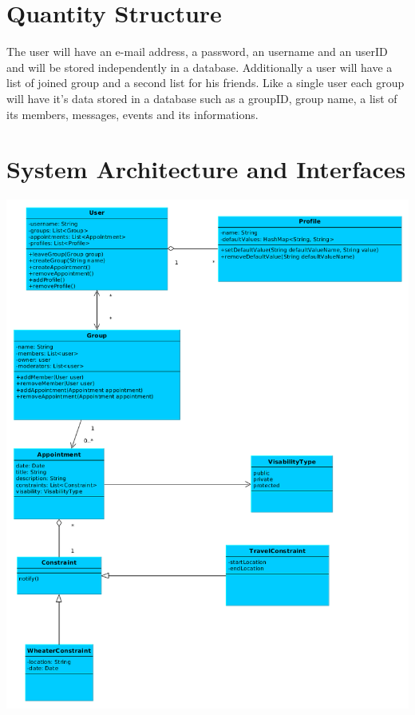 \documentclass[12pt]{scrartcl}
\begin{document}

    \section{Quantity Structure}                                %
        The user will have an e-mail address, a password, an username and an userID and will be stored independently
        in a database. Additionally a user will have a list of joined group and a second list for his friends.
        Like a single user each group will have it's data stored in a database such as a groupID, group name,
        a list of its members, messages, events and its informations.


    \section{System Architecture and Interfaces}                %
        \includegraphics[scale=.5]{Materials/Images/system_architecture.png} \\ %
\end{document}
